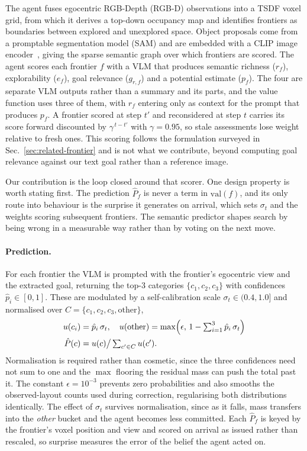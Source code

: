 The agent fuses egocentric RGB-Depth (RGB-D) observations into a TSDF voxel grid, from which it derives a top-down occupancy map and identifies frontiers as boundaries between explored and unexplored space. Object proposals come from a promptable segmentation model (SAM) and are embedded with a CLIP image encoder~\cite{radford2021clip}, giving the sparse semantic graph over which frontiers are scored. The agent scores each frontier $f$ with a VLM that produces semantic richness ($r_f$), explorability ($e_f$), goal relevance ($g_{r,f}$) and a potential estimate ($p_f$). The four are separate VLM outputs rather than a summary and its parts, and the value function uses three of them, with $r_f$ entering only as context for the prompt that produces $p_f$. A frontier scored at step $t'$ and reconsidered at step $t$ carries its score forward discounted by $\gamma^{\,t - t'}$ with $\gamma = 0.95$, so stale assessments lose weight relative to fresh ones. This scoring follows the formulation surveyed in Sec.~\ref{sec:related-frontier} and is not what we contribute, beyond computing goal relevance against our text goal rather than a reference image.

Our contribution is the loop closed around that scorer. One design property is worth stating first. The prediction $\hat{P}_f$ is never a term in $\mathrm{val}(f)$, and its only route into behaviour is the surprise it generates on arrival, which sets $\sigma_t$ and the weights scoring subsequent frontiers. The semantic predictor shapes search by being wrong in a measurable way rather than by voting on the next move.

\paragraph{Prediction.} For each frontier the VLM is prompted with the frontier's egocentric view and the extracted goal, returning the top-3 categories $\{c_1, c_2, c_3\}$ with confidences $\hat{p}_i \in [0,1]$. These are modulated by a self-calibration scale $\sigma_t \in (0.4, 1.0]$ and normalised over $C = \{c_1, c_2, c_3, \text{other}\}$,
\begin{align}
    u(c_i) &= \hat{p}_i \, \sigma_t, \quad
    u(\text{other}) = \max\!\left(\epsilon,\, 1 - \textstyle\sum_{i=1}^{3} \hat{p}_i \, \sigma_t\right)
    \label{eq:predict} \\
    \hat{P}(c) &= u(c) \big/ \textstyle\sum_{c' \in C} u(c') . \notag
\end{align}
Normalisation is required rather than cosmetic, since the three confidences need not sum to one and the $\max$ flooring the residual mass can push the total past it. The constant $\epsilon = 10^{-3}$ prevents zero probabilities and also smooths the observed-layout counts used during correction, regularising both distributions identically. The effect of $\sigma_t$ survives normalisation, since as it falls, mass transfers into the \emph{other} bucket and the agent becomes less committed. Each $\hat{P}_f$ is keyed by the frontier's voxel position and view and scored on arrival as issued rather than rescaled, so surprise measures the error of the belief the agent acted on.

